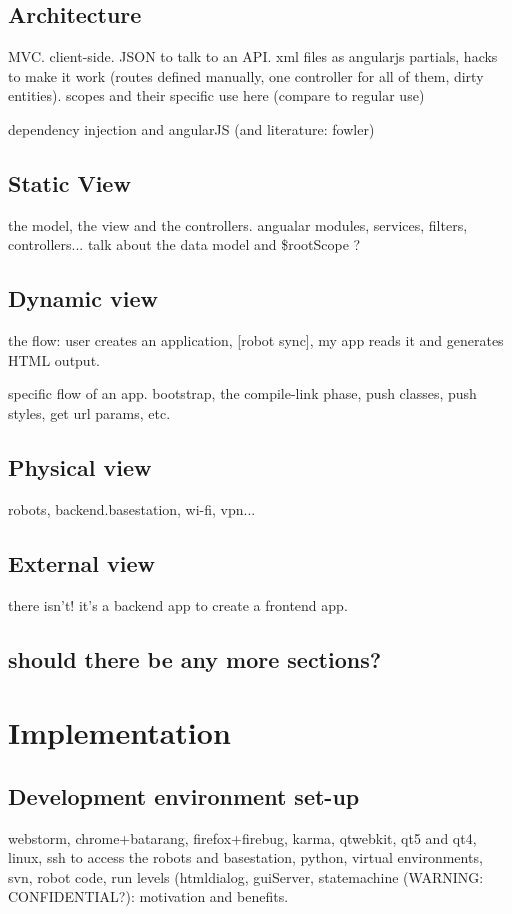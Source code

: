 \section{Architecture}
MVC. client-side. JSON to talk to an API. xml files as angularjs partials, hacks to make it work (routes defined manually, one controller for all of them, dirty entities). scopes and their specific use here (compare to regular use)

dependency injection and angularJS (and literature: fowler)

\section{Static View}
the model, the view and the controllers. angualar modules, services, filters, controllers...
talk about the data model and \$rootScope ?

\section{Dynamic view}
the flow: user creates an application, [robot sync], my app reads it and generates HTML output.

specific flow of an app. bootstrap, the compile-link phase, push classes, push styles, get url params, etc.

\section{Physical view}
robots, backend.basestation, wi-fi, vpn...

\section{External view}
there isn't! it's a backend app to create a frontend app.

\section{should there be any more sections?}

\chapter{Implementation}
\section{Development environment set-up}
webstorm, chrome+batarang, firefox+firebug, karma, qtwebkit, qt5 and qt4, linux, ssh to access the robots and basestation, python, virtual environments, svn, robot code, run levels (htmldialog, guiServer, statemachine (WARNING: CONFIDENTIAL?): motivation and benefits.


